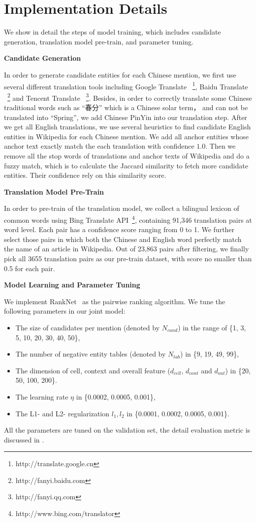\section{Implementation Details}
\label{sec:impl-detail}

We show in detail the steps of model training, which includes candidate generation,
translation model pre-train, and parameter tuning.

\textbf{Candidate Generation}

In order to generate candidate entities for each Chinese mention, we first use several different translation tools including Google Translate ~\footnote{http://translate.google.cn}, Baidu Translate ~\footnote{http://fanyi.baidu.com} and Tencent Translate ~\footnote{http://fanyi.qq.com}. Besides, in order to correctly translate some Chinese traditional words such as ``春分'' which is a Chinese solar term， and can not be translated into ``Spring'', we add Chinese PinYin into our translation step.
After we get all English translations, we use several heuristics to find candidate English entities in Wikipedia for each Chinese mention.
We add all anchor entities whose anchor text exactly match the each translation with confidence $1.0$. Then we remove all the stop words of translations and anchor texts of Wikipedia and do a fuzzy match, which is to calculate the Jaccard similarity to fetch more candidate entities. Their confidence rely on this similarity score.




\noindent
\textbf{Translation Model Pre-Train}

In order to pre-train of the translation model,
we collect a bilingual lexicon of common words using
Bing Translate API~\footnote{http://www.bing.com/translator},
containing 91,346 translation pairs at word level.
Each pair has a confidence score ranging from 0 to 1.
We further select those pairs in which both the Chinese and English word perfectly
match the name of an article in Wikipedia.
Out of 23,863 pairs after filtering, we finally pick all 3655 translation pairs
as our pre-train dataset, with score no smaller than 0.5 for each pair.


\noindent
\textbf{Model Learning and Parameter Tuning}

We implement RankNet~\cite{burges2010ranknet} as the pairwise ranking algorithm.
We tune the following parameters in our joint model:
\begin{itemize}
\item The size of candidates per mention (denoted by $N_{cand}$)
in the range of \{1, 3, 5, 10, 20, 30, 40, 50\}, 
\item The number of negative entity tables (denoted by $N_{tab}$) in \{9, 19, 49, 99\},
\item The dimension of cell, context and overall feature ($d_{cell}$, $d_{cont}$ and $d_{out}$) in \{20, 50, 100, 200\}.
\item The learning rate $\eta$ in \{0.0002, 0.0005, 0.001\},
\item The L1- and L2- regularization $l_1, l_2$ in \{0.0001, 0.0002, 0.0005, 0.001\}.
\end{itemize}

All the parameters are tuned on the validation set, the detail evaluation metric
is discussed in .


